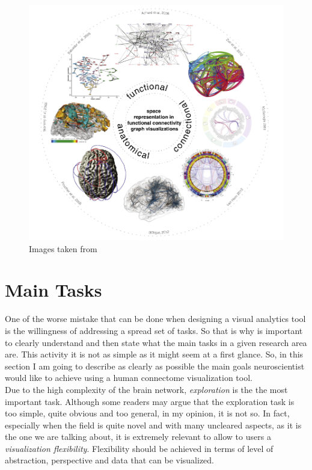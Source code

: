 \documentclass{article}
\begin{document}
\begin{multicols}{2}
\begin{figure}[ht]
\centering
\includegraphics[width = 1.8\columnwidth]{taxonomy}
\caption{Images taken from \cite{visualizingHumanConnectome}}
\label{fig:taxonomy}
\end{figure}
\section{Main Tasks}
\label{sec:mainTasks}

One of the worse mistake that can be done when designing a visual analytics tool is the willingness of addressing a spread set of tasks. So that is why is important to clearly understand and then state what the main tasks in a given research area are. This activity it is not as simple as it might seem at a first glance. So, in this section I am going to describe as clearly as possible the main goals neuroscientist would like to achieve using a human connectome visualization tool.\\

Due to the high complexity of the brain network, \textit{exploration} is the the most important task. Although some readers may argue that the exploration task is too simple, quite obvious and too general, in my opinion, it is not so. In fact, especially when the field is quite novel and with many uncleared aspects, as it is the one we are talking about, it is extremely relevant to allow to users a \textit{visualization flexibility}. Flexibility should be achieved in terms of level of abstraction, perspective and data that can be visualized. \\



\end{multicols}
\end{document}
